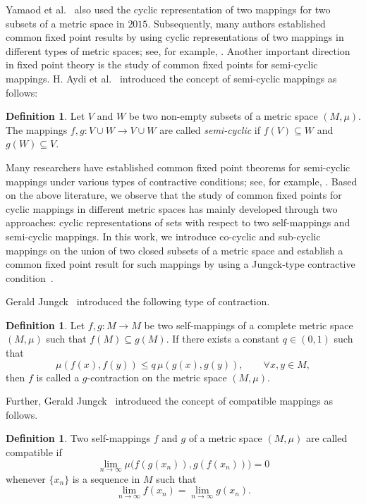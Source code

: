 \documentclass[11pt,a4paper,margin=1in]{amsart}
\theoremstyle{plain}
\theoremstyle{definition}
\newtheorem{definition}[theorem]{Definition}
\theoremstyle{remark}
\begin{document}
Yamaod et al.~\cite{O.Y} also used the cyclic representation of two
mappings for two subsets of a metric space in $2015$. Subsequently, many authors established common fixed point results by using cyclic representations of two mappings in different types of metric spaces; see, for example, \cite{A.R,J.L,J.L.M,M.B,W.G}. Another important direction in fixed point theory is the study of common fixed points for semi-cyclic mappings. H. Aydi et al.~\cite{H.A} introduced the concept of semi-cyclic mappings as follows:


\begin{definition}\label{def:semi-cyclic-mapping}
Let $V$ and $W$ be two non-empty subsets of a metric space $(M,\mu)$.
The mappings $f,g:V\cup W\to V\cup W$ are called \emph{semi-cyclic} if $f(V)\subseteq W$ and $g(W)\subseteq V$. 
\end{definition}

Many researchers have established common fixed point theorems for
semi-cyclic mappings under various types of contractive conditions; see, for example, \cite{M.L,S.W,S.W.X,S.W.Y}. Based on the above literature, we observe that the study of common fixed points for cyclic mappings in different metric spaces has mainly developed through two approaches:
cyclic representations of sets with respect to two self-mappings and
semi-cyclic mappings. In this work, we introduce co-cyclic and sub-cyclic
mappings on the union of two closed subsets of a metric space and establish
a common fixed point result for such mappings by using a Jungck-type
contractive condition~\cite{G.03}.

Gerald Jungck~\cite{G.03} introduced the following type of contraction.

\begin{definition}\label{def:g-contraction}
Let $f,g:M\to M$ be two self-mappings of a complete metric space
$(M,\mu)$ such that $f(M)\subseteq g(M)$. If there exists a constant
$q\in(0,1)$ such that
\[
\mu(f(x),f(y))\leq q\,\mu(g(x),g(y)),
\qquad \forall x,y\in M,
\]
then $f$ is called a $g$-contraction on the metric space $(M,\mu)$.
\end{definition}

Further, Gerald Jungck~\cite{G.04} introduced the concept of compatible
mappings as follows.

\begin{definition}\label{def:compatible-mappings}
Two self-mappings $f$ and $g$ of a metric space $(M,\mu)$ are called
compatible if
\[
\lim_{n\to\infty}\mu\bigl(f(g(x_n)),g(f(x_n))\bigr)=0
\]
whenever $\{x_n\}$ is a sequence in $M$ such that
\[
\lim_{n\to\infty}f(x_n)
=
\lim_{n\to\infty}g(x_n).
\]
\end{definition}
\end{document}
